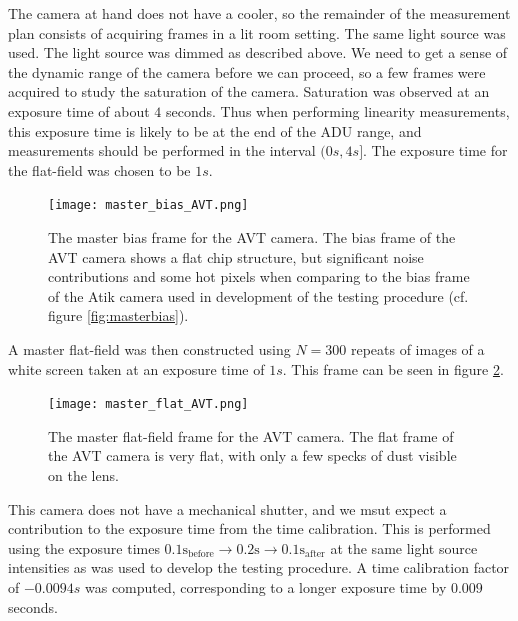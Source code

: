 \documentclass[../main.tex]{subfiles}
\begin{document}
		The camera at hand does not have a cooler, so the remainder of the measurement plan consists of acquiring frames in a lit room setting. The same light source was used. The light source was dimmed as described above. We need to get a sense of the dynamic range of the camera before we can proceed, so a few frames were acquired to study the saturation of the camera. Saturation was observed at an exposure time of about $4$ seconds. Thus when performing linearity measurements, this exposure time is likely to be at the end of the ADU range, and measurements should be performed in the interval $(0s, 4s]$. The exposure time for the flat-field was chosen to be $1s$.
		
		\begin{figure}
			\centering			\texttt{[image: master\_bias\_AVT.png]}
			\caption{The master bias frame for the AVT camera. The bias frame of the AVT camera shows a flat chip structure, but significant noise contributions and some hot pixels when comparing to the bias frame of the Atik camera used in development of the testing procedure (cf. figure \ref{fig:masterbias}).}
			\label{fig:avtbias}
		\end{figure}
		
		A master flat-field was then constructed using $N=300$ repeats of images of a white screen taken at an exposure time of $1s$. This frame can be seen in figure \ref{fig:avtflat}. 
	
		\begin{figure}[hbt!]
			\centering			\texttt{[image: master\_flat\_AVT.png]}
			\caption{The master flat-field frame for the AVT camera. The flat frame of the AVT camera is very flat, with only a few specks of dust visible on the lens.}
			\label{fig:avtflat}
		\end{figure}
	
		This camera does not have a mechanical shutter, and we msut expect a contribution to the exposure time from the time calibration. This is performed using the exposure times $0.1\text{s}_\text{before} \rightarrow 0.2\text{s} \rightarrow 0.1\text{s}_\text{after}$ at the same light source intensities as was used to develop the testing procedure. A time calibration factor of $-0.0094s$ was computed, corresponding to a longer exposure time by $0.009$ seconds. 
		
\end{document}
